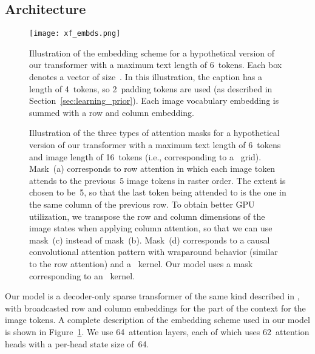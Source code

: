 \documentclass{article}
\begin{document}
\subsection{Architecture}
\label{sec:xf_arch}
\begin{figure}[t]
    \centering
    \texttt{[image: xf\_embds.png]}
    \caption{Illustration of the embedding scheme for a hypothetical version of our transformer with a maximum text length of 6~tokens. Each box denotes a vector of size~. In this illustration, the caption has a length of 4~tokens, so 2~padding tokens are used (as described in Section~\ref{sec:learning_prior}). Each image vocabulary embedding is summed with a row and column embedding.}
    \label{fig:xf_embds}
\end{figure}
\begin{figure}[t]
    \centering
    \hspace{2mm}\hspace{2mm}\hspace{2mm}\caption{Illustration of the three types of attention masks for a hypothetical version of our transformer with a maximum text length of 6~tokens and image length of 16~tokens (i.e., corresponding to a~ grid). Mask~(a) corresponds to row attention in which each image token attends to the previous~5 image tokens in raster order. The extent is chosen to be~5, so that the last token being attended to is the one in the same column of the previous row. To obtain better GPU utilization, we transpose the row and column dimensions of the image states when applying column attention, so that we can use mask~(c) instead of mask~(b). Mask~(d) corresponds to a causal convolutional attention pattern with wraparound behavior (similar to the row attention) and a~ kernel. Our model uses a mask corresponding to an~ kernel.}
    \label{fig:xf_attn}
\end{figure}
Our model is a decoder-only sparse transformer of the same kind described in \citet{child2019generating}, with broadcasted row and column embeddings for the part of the context for the image tokens. A complete description of the embedding scheme used in our model is shown in Figure~\ref{fig:xf_embds}. We use 64~attention layers, each of which uses 62~attention heads with a per-head state size of~64.
\end{document}
